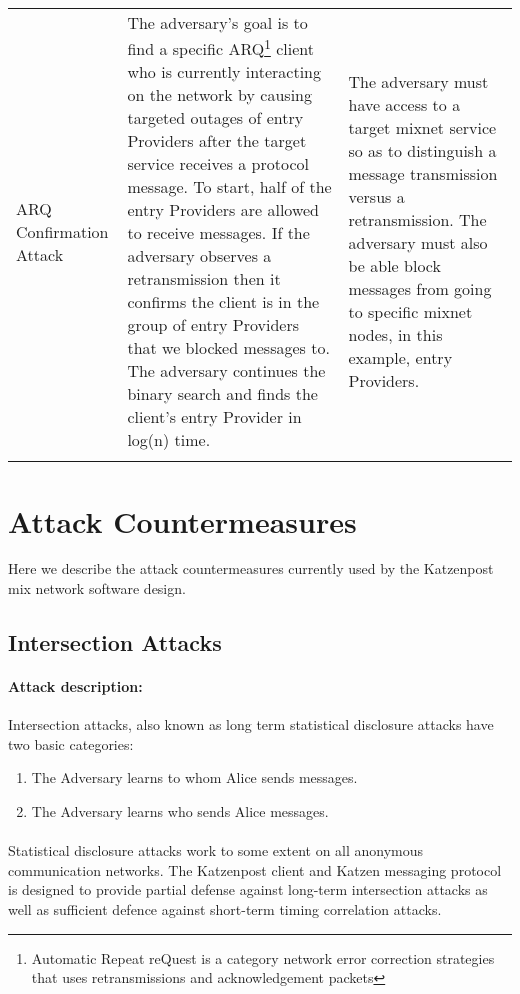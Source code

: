 \documentclass{article}
\begin{document}
\begin{center}
\begin{tabularx}{\textwidth}[t]{|m{}| m{}| m{}| }
\hline ARQ Confirmation Attack & The adversary's goal is to find a specific ARQ\footnote{Automatic Repeat reQuest is a category network error correction strategies that uses retransmissions and acknowledgement packets} client who is currently interacting on the network by causing targeted outages of entry Providers after the target service receives a protocol message. To start, half of the entry Providers are allowed to receive messages. If the adversary observes a retransmission then it confirms the client is in the group of entry Providers that we blocked messages to. The adversary continues the binary search and finds the client's entry Provider in log(n) time. & The adversary must have access to a target mixnet service so as to distinguish a message transmission versus a retransmission. The adversary must also be able block messages from going to specific mixnet nodes, in this example, entry Providers. \\



\arrayrulecolor{blue}
\hline
\end{tabularx}
\end{center}
\pagebreak


\section{Attack Countermeasures}

Here we describe the attack countermeasures currently used by the Katzenpost mix network software design.

\subsection{Intersection Attacks}

\paragraph{Attack description:}
Intersection attacks, also known as long term statistical disclosure attacks have two basic categories:\\
\begin{enumerate}
    \item The Adversary learns to whom Alice sends messages.
    \item The Adversary learns who sends Alice messages.
\end{enumerate}

\paragraph{}Statistical disclosure attacks work to some extent on all
anonymous communication networks. The Katzenpost client and Katzen
messaging protocol is designed to provide partial defense against long-term
intersection attacks as well as sufficient defence against short-term timing
correlation attacks.
\end{document}
